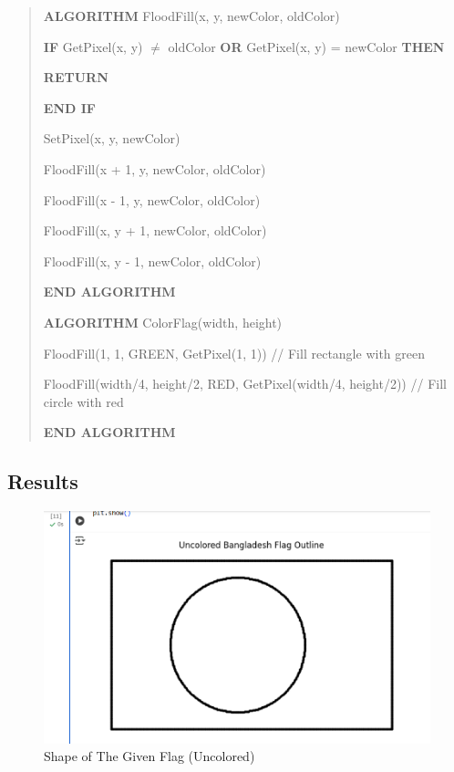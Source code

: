 \documentclass[12pt]{article}
\begin{document}
\begin{quote}
\textbf{ALGORITHM} FloodFill(x, y, newColor, oldColor)

\hspace{1em} \textbf{IF} GetPixel(x, y) $\neq$ oldColor \textbf{OR} GetPixel(x, y) = newColor \textbf{THEN}

\hspace{2em} \textbf{RETURN}

\hspace{1em} \textbf{END IF}

\hspace{1em} SetPixel(x, y, newColor)

\hspace{1em} FloodFill(x + 1, y, newColor, oldColor)

\hspace{1em} FloodFill(x - 1, y, newColor, oldColor)

\hspace{1em} FloodFill(x, y + 1, newColor, oldColor)

\hspace{1em} FloodFill(x, y - 1, newColor, oldColor)

\textbf{END ALGORITHM}

\vspace{1em}

\textbf{ALGORITHM} ColorFlag(width, height)

\hspace{1em} FloodFill(1, 1, GREEN, GetPixel(1, 1)) // Fill rectangle with green

\hspace{1em} FloodFill(width/4, height/2, RED, GetPixel(width/4, height/2)) // Fill circle with red

\textbf{END ALGORITHM}
\end{quote}

\subsection*{Results}
\begin{figure}[H]
    \centering
    \includegraphics[width=1.0\textwidth]{uncolor.png}
    \caption{Shape of The Given Flag (Uncolored)}
\end{figure}
\end{document}
